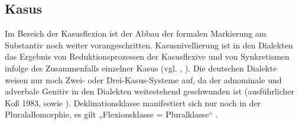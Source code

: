 \subsection{Kasus}
\label{sec:4.2.2}
Im Bereich der Kasusflexion ist der Abbau der formalen Markierung am Substantiv noch weiter vorangeschritten. Kasusnivellierung ist in den Dialekten das Ergebnis von Reduktionsprozessen der Kasusflexive und von Synkretismen infolge des Zusammenfalls einzelner Kasus (vgl. \citealt[623]{Rabanus2019}, \citealt[432]{Schirmunski1962}). Die deutschen Dialekte weisen nur noch Zwei- oder Drei-Kasus-Systeme auf, da der adnominale und adverbale Genitiv in den Dialekten weitestehend geschwunden ist (ausführlicher Koß 1983, \citealt[433--437]{Schirmunski1962} sowie \citealt{Shrier1965}). Deklinationsklasse manifestiert sich nur noch in der Pluralallomorphie, es gilt „Flexionsklasse = Pluralklasse“ \citep[313]{Nübling2008}.

